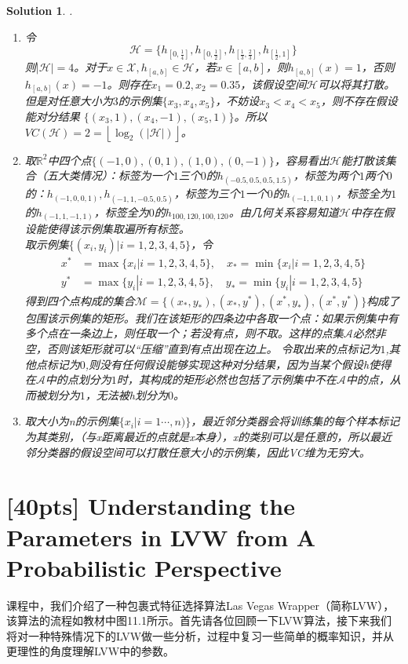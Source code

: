 \documentclass[a4paper,UTF8]{article}
\newtheorem*{solution}{Solution}
\numberwithin{equation}{section}
\begin{document}
\begin{solution}.
\begin{enumerate}[$(1)$]
	\item 令$$\mathcal{H}=\{h_{[0,\frac{1}{4}]},h_{[0,\frac{1}{2}]},h_{[\frac{1}{3},\frac{2}{3}]},h_{[\frac{1}{2},1]}\}$$
	则$|\mathcal{H}|=4$。对于$x\in\mathcal{X},h_{[a,b]}\in\mathcal{H}$，若$x\in [a,b]$，则$h_{[a,b]}(x)=1$，否则$h_{[a,b]}(x)=-1$。则存在$x_1=0.2,x_2=0.35$，该假设空间$\mathcal{H}$可以将其打散。但是对任意大小为$3$的示例集$\{x_3,x_4,x_5\}$，不妨设$x_3<x_4<x_5$，则不存在假设能对分结果
	$\{(x_3,1),(x_4,-1),(x_5,1)\}$。所以$VC(\mathcal{H})=2=\left \lfloor \log_2(\left| \mathcal{H} \right| ) \right \rfloor$。
	\item 取$\mathbb{R}^2$中四个点$\{(-1,0),(0,1),(1,0),(0,-1)\}$，容易看出$\mathcal{H}$能打散该集合（五大类情况）：标签为一个$1$三个$0$的$h_{(-0.5,0.5,0.5,1.5)}$，标签为两个$1$两个$0$的：$h_{(-1,0,0,1)},h_{(-1,1,-0.5,0.5)}$，标签为三个$1$一个$0$的$h_{(-1,1,0,1)}$，标签全为$1$的$h_{(-1,1,-1,1)}$，标签全为$0$的$h_{100,120,100,120}$。由几何关系容易知道$\mathcal{H}$中存在假设能使得该示例集取遍所有标签。
	      \\取示例集$\{(x_i,y_i)|i=1,2,3,4,5\}$，令
	      \begin{align*}
	      	x^*&=\max\{x_i|i=1,2,3,4,5\},\quad
	      	x_*=\min\{x_i|i=1,2,3,4,5\}\\
	      	y^*&=\max\{y_i|i=1,2,3,4,5\},\quad
	      	y_*=\min\{y_i|i=1,2,3,4,5\}
	      \end{align*}
          得到四个点构成的集合$\mathcal{M}=\{(x_*,y_*),(x_*,y^*),(x^*,y_*),(x^*,y^*)\}$构成了包围该示例集的矩形。我们在该矩形的四条边中各取一个点：如果示例集中有多个点在一条边上，则任取一个；若没有点，则不取。这样的点集$\mathcal{A}$必然非空，否则该矩形就可以“压缩”直到有点出现在边上。
	      令取出来的点标记为$1$,其他点标记为$0$,则没有任何假设能够实现这种对分结果，因为当某个假设h使得在$\mathcal{A}$中的点划分为$1$时，其构成的矩形必然也包括了示例集中不在$\mathcal{A}$中的点，从而被划分为$1$，无法被h划分为$0$。
	 \item 取大小为n的示例集$\{x_i|i=1\cdots,n)\}$，最近邻分类器会将训练集的每个样本标记为其类别，（与x距离最近的点就是x本身），x的类别可以是任意的，所以最近邻分类器的假设空间可以打散任意大小的示例集，因此VC维为无穷大。
\end{enumerate}
\end{solution}

\section{\textbf{[40pts]} Understanding the Parameters in LVW from A Probabilistic Perspective}
课程中，我们介绍了一种包裹式特征选择算法Las Vegas Wrapper（简称LVW），该算法的流程如教材中图11.1所示。首先请各位回顾一下LVW算法，接下来我们将对一种特殊情况下的LVW做一些分析，过程中复习一些简单的概率知识，并从更理性的角度理解LVW中的参数。
\end{document}
